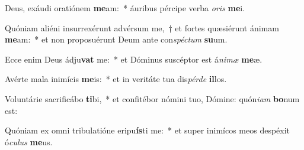 \item Deus, exáudi oratiónem \textbf{me}am:~* áuribus pércipe verba \textit{o}\textit{ris} \textbf{me}i.
\item Quóniam aliéni insurrexérunt advérsum me,~† et fortes quæsiérunt ánimam \textbf{me}am:~* et non proposuérunt Deum ante con\textit{spéc}\textit{tum} \textbf{su}um.
\item Ecce enim Deus ádju\textbf{vat} me:~* et Dóminus suscéptor est á\textit{ni}\textit{mæ} \textbf{me}æ.
\item Avérte mala inimícis \textbf{me}is:~* et in veritáte tua dis\textit{pér}\textit{de} \textbf{il}los.
\item Voluntárie sacrificábo \textbf{ti}bi,~* et confitébor nómini tuo, Dómine: quón\textit{i}\textit{am} \textbf{bo}num est:
\item Quóniam ex omni tribulatióne eripu\textbf{ís}ti me:~* et super inimícos meos despéxit ó\textit{cu}\textit{lus} \textbf{me}us.
